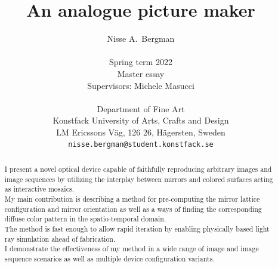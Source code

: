 \documentclass{article}
\title{An analogue picture maker}
\author{
  Nisse A.~Bergman \\
  \\
  Spring term 2022\\
  Master essay\\
  Supervisors: Michele Masucci\\
  \\
  Department of Fine Art\\
  Konstfack University of Arts, Crafts and Design\\
  LM Ericssons Väg, 126 26, Hägersten, Sweden \\
  \texttt{nisse.bergman@student.konstfack.se} \\
}
\begin{document}
\maketitle

\begin{abstract}
I present a novel optical device capable of faithfully reproducing
arbitrary images and image sequences by utilizing the interplay between
mirrors and colored surfaces acting as interactive mosaics.\\
My main contribution is describing a method for pre-computing the mirror
lattice configuration and mirror orientation as well as a ways of
finding the corresponding diffuse color pattern in the spatio-temporal
domain. \\
The method is fast enough to allow rapid iteration by enabling
physically based light ray simulation ahead of fabrication.\\
I demonstrate the effectiveness of my method in a wide range of image
and image sequence scenarios as well as multiple device configuration
variants.
\end{abstract}
\end{document}
